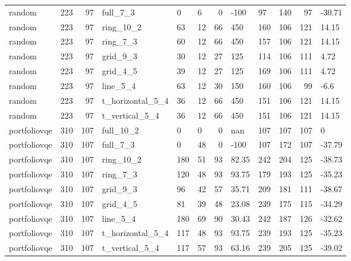 \begin{longtable}{lrrlllrlllrl}
random & 223 & 97 & full\_7\_3 & 0 & 6 & 0 & -100 & 97 & 140 & 97 & -30.71 \\
random & 223 & 97 & ring\_10\_2 & 63 & 12 & 66 & 450 & 160 & 106 & 121 & 14.15 \\
random & 223 & 97 & ring\_7\_3 & 60 & 12 & 66 & 450 & 157 & 106 & 121 & 14.15 \\
random & 223 & 97 & grid\_9\_3 & 30 & 12 & 27 & 125 & 114 & 106 & 111 & 4.72 \\
random & 223 & 97 & grid\_4\_5 & 39 & 12 & 27 & 125 & 169 & 106 & 111 & 4.72 \\
random & 223 & 97 & line\_5\_4 & 63 & 12 & 30 & 150 & 160 & 106 & 99 & -6.6 \\
random & 223 & 97 & t\_horizontal\_5\_4 & 36 & 12 & 66 & 450 & 151 & 106 & 121 & 14.15 \\
random & 223 & 97 & t\_vertical\_5\_4 & 36 & 12 & 66 & 450 & 151 & 106 & 121 & 14.15 \\
portfoliovqe & 310 & 107 & full\_10\_2 & 0 & 0 & 0 & nan & 107 & 107 & 107 & 0 \\
portfoliovqe & 310 & 107 & full\_7\_3 & 0 & 48 & 0 & -100 & 107 & 172 & 107 & -37.79 \\
portfoliovqe & 310 & 107 & ring\_10\_2 & 180 & 51 & 93 & 82.35 & 242 & 204 & 125 & -38.73 \\
portfoliovqe & 310 & 107 & ring\_7\_3 & 120 & 48 & 93 & 93.75 & 179 & 193 & 125 & -35.23 \\
portfoliovqe & 310 & 107 & grid\_9\_3 & 96 & 42 & 57 & 35.71 & 209 & 181 & 111 & -38.67 \\
portfoliovqe & 310 & 107 & grid\_4\_5 & 81 & 39 & 48 & 23.08 & 239 & 175 & 115 & -34.29 \\
portfoliovqe & 310 & 107 & line\_5\_4 & 180 & 69 & 90 & 30.43 & 242 & 187 & 126 & -32.62 \\
portfoliovqe & 310 & 107 & t\_horizontal\_5\_4 & 117 & 48 & 93 & 93.75 & 239 & 193 & 125 & -35.23 \\
portfoliovqe & 310 & 107 & t\_vertical\_5\_4 & 117 & 57 & 93 & 63.16 & 239 & 205 & 125 & -39.02 \\
\end{longtable}
